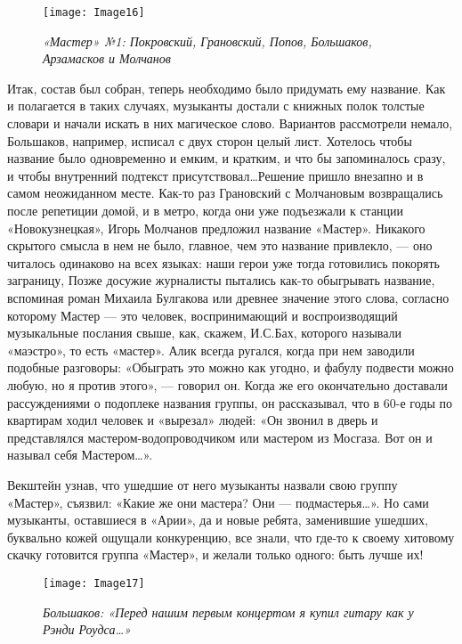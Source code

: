 \documentclass[16pt,a5paper,oneside]{book}
\begin{document}
\begin{figure}
    \centering
    \texttt{[image: Image16]}
    \caption{\textit{«Мастер» №1: Покровский, Грановский, Попов, Большаков, Арзамасков и Молчанов}}
\end{figure}

Итак, состав был собран, теперь необходимо было придумать ему название. Как и полагается в таких случаях, музыканты
достали с книжных полок толстые словари и начали искать в них магическое слово. Вариантов рассмотрели немало, Большаков,
например, исписал с двух сторон целый лист. Хотелось чтобы название было одновременно и емким, и кратким, и что бы
запоминалось сразу, и чтобы внутренний подтекст присутствовал\ldots Решение пришло внезапно и в самом неожиданном месте.
Как-то раз Грановский с Молчановым возвращались после репетиции домой, и в метро, когда они уже подъезжали к станции
«Новокузнецкая», Игорь Молчанов предложил название «Мастер». Никакого скрытого смысла в нем не было, главное, чем это
название привлекло, — оно читалось одинаково на всех языках: наши герои уже тогда готовились покорять заграницу, Позже
досужие журналисты пытались как-то обыгрывать название, вспоминая роман Михаила Булгакова или древнее значение этого
слова, согласно которому Мастер — это человек, воспринимающий и воспроизводящий музыкальные послания свыше, как, скажем,
И.С.Бах, которого называли «маэстро», то есть «мастер». Алик всегда ругался, когда при нем заводили подобные разговоры:
«Обыграть это можно как угодно, и фабулу подвести можно любую, но я против этого», — говорил он. Когда же его
окончательно доставали рассуждениями о подоплеке названия группы, он рассказывал, что в 60-е годы по квартирам ходил
человек и «вырезал» людей: «Он звонил в дверь и представлялся мастером-водопроводчиком или мастером из Мосгаза. Вот он и
называл себя Мастером\ldots».

Векштейн узнав, что ушедшие от него музыканты назвали свою группу «Мастер», съязвил: «Какие же они мастера? Они —
подмастерья\ldots». Но сами музыканты, оставшиеся в «Арии», да и новые ребята, заменившие ушедших, буквально кожей
ощущали конкуренцию, все знали, что где-то к своему хитовому скачку готовится группа «Мастер», и желали только одного:
быть лучше их!

\begin{wrapfigure}{R}{0.5\textwidth}
    \centering
    \texttt{[image: Image17]}
    \caption{\textit{Большаков: «Перед нашим первым концертом я купил гитару как у Рэнди Роудса\ldots»}}
\end{wrapfigure}
\end{document}
